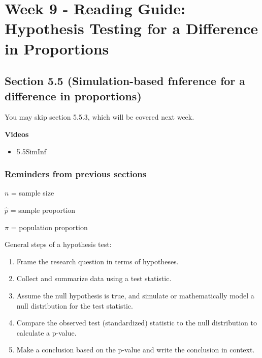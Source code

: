 \documentclass[
]{report}
\providecommand{\tightlist}{%
  \setlength{\itemsep}{0pt}\setlength{\parskip}{0pt}}
\begin{document}
\hypertarget{week-9---reading-guide-hypothesis-testing-for-a-difference-in-proportions}{%
\section{Week 9 - Reading Guide: Hypothesis Testing for a Difference in Proportions}\label{week-9---reading-guide-hypothesis-testing-for-a-difference-in-proportions}}

\hypertarget{section-5.5-simulation-based-fnference-for-a-difference-in-proportions}{%
\subsection*{Section 5.5 (Simulation-based fnference for a difference in proportions)}\label{section-5.5-simulation-based-fnference-for-a-difference-in-proportions}}

You may skip section 5.5.3, which will be covered next week.

\textbf{Videos}

\begin{itemize}
\tightlist
\item
  5.5SimInf
\end{itemize}


\hypertarget{reminders-from-previous-sections-3}{%
\subsubsection*{Reminders from previous sections}\label{reminders-from-previous-sections-3}}

\(n\) = sample size

\(\hat{p}\) = sample proportion

\(\pi\) = population proportion

General steps of a hypothesis test:

\begin{enumerate}
\def\labelenumi{\arabic{enumi}.}
\item
  Frame the research question in terms of hypotheses.
\item
  Collect and summarize data using a test statistic.
\item
  Assume the null hypothesis is true, and simulate or mathematically model a null distribution for the test statistic.
\item
  Compare the observed test (standardized) statistic to the null distribution to calculate a p-value.
\item
  Make a conclusion based on the p-value and write the conclusion in context.
\end{enumerate}
\end{document}
